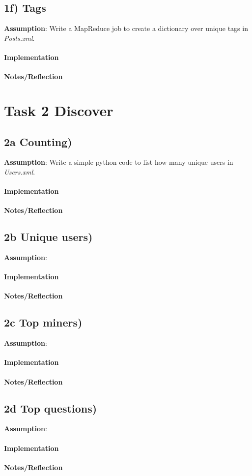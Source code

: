 \documentclass[fleqn,10pt]{wlscirep}
\begin{document}
\subsection*{1f) Tags}
\textbf{Assumption}: Write a MapReduce job to create a dictionary over unique tags in  \textit{Posts.xml}. \\ \\
\textbf{Implementation}  \\ \\
\textbf{Notes/Reflection}

\section*{Task 2 Discover}

\subsection*{2a Counting) }
\textbf{Assumption}: Write a simple python code to list how many unique users in \textit{Users.xml}. \\ \\
\textbf{Implementation}  \\ \\
\textbf{Notes/Reflection}

\subsection*{2b Unique users) }
\textbf{Assumption}:  \\ \\
\textbf{Implementation}  \\ \\
\textbf{Notes/Reflection}

\subsection*{2c Top miners) }
\textbf{Assumption}:  \\ \\
\textbf{Implementation}  \\ \\
\textbf{Notes/Reflection}

\subsection*{2d Top questions) }
\textbf{Assumption}:  \\ \\
\textbf{Implementation}  \\ \\
\textbf{Notes/Reflection}
\end{document}
